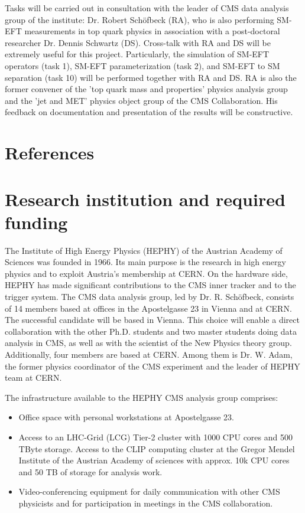 \documentclass[a4paper,11pt]{article}
\begin{document}
{Tasks will be carried out in consultation with the leader of CMS data analysis group of the institute: Dr. Robert Sch{\"o}fbeck (RA), who is also performing SM-EFT measurements in top quark physics in association with a post-doctoral researcher Dr. Dennis Schwartz (DS). Cross-talk with RA and DS will be extremely useful for this project. 
Particularly, the simulation of SM-EFT operators (task 1), SM-EFT parameterization (task 2), and SM-EFT to SM separation (task 10) will be performed together with RA and DS. 
RA is also the former convener of the 'top quark mass and properties' physics analysis group and the 'jet and MET' physics object group of the CMS Collaboration. 
His feedback on documentation and presentation of the results will be constructive. 

\appendix
\renewcommand{\thesection}{Annex \arabic{section}} 

\clearpage
\section{References}
\renewcommand{\refname}{}
{
%


}

\newpage

\section{Research institution and required funding}

The Institute of High Energy Physics (HEPHY) of the Austrian Academy of Sciences was founded in 1966. 
Its main purpose is the research in high energy physics and to exploit Austria's membership at CERN. 
On the hardware side, HEPHY has made significant contributions to the CMS inner tracker and to the trigger system. 
The CMS data analysis group, led by Dr. R. Sch{\"o}fbeck, consists of 14 members based at offices in the Apostelgasse 23 in Vienna and at CERN. The successful candidate will be based in Vienna. 
This choice will enable a direct collaboration with the other Ph.D. students and two master students doing data analysis in CMS, as well as with the scientist of the New Physics theory group.
Additionally, four members are based at CERN. 
Among them is Dr. W. Adam, the former physics coordinator of the CMS experiment and the leader of HEPHY team at CERN.

The infrastructure available to the HEPHY CMS analysis group comprises:
\begin{itemize}
\item Office space with personal workstations at Apostelgasse 23.
\item Access to an LHC-Grid (LCG) Tier-2 cluster with 1000 CPU cores and 500 TByte storage. Access to the CLIP computing cluster at the Gregor Mendel Institute of the Austrian Academy of sciences with approx. 10k CPU cores and 50 TB of
storage for analysis work.
\item Video-conferencing equipment for daily communication with other CMS physicists and for participation in meetings in the CMS collaboration.
\end{itemize}

}
\end{document}
